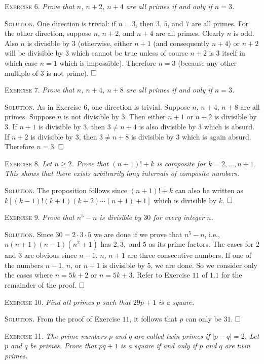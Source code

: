 \documentclass[11pt, leqno]{article}
\newcommand{\done}{\ensuremath{\hfill\square}}
\begin{document}
\textsc{Exercise 6}. \emph{Prove that $n$, $n+2$, $n+4$ are all primes if and only if $n=3$.}

\textsc{Solution}. One direction is trivial: if $n=3$, then $3$, $5$, and $7$ are all primes. For the other direction, suppose $n$, $n+2$, and $n+4$ are all primes. Clearly $n$ is odd. Also $n$ is divisible by $3$ (otherwise, either $n+1$ (and consequently $n+4$) or $n+2$ will be divisible by $3$ which cannot be true unless of course $n+2$ is $3$ itself in which case $n=1$ which is impossible). Therefore $n=3$ (because any other multiple of 3 is not prime). \done

\textsc{Exercise 7}. \emph{Prove that $n$, $n+4$, $n+8$ are all primes if and only if $n=3$.}

\textsc{Solution}. As in Exercise 6, one direction is trivial. Suppose $n$, $n+4$, $n+8$ are all primes. Suppose $n$ is not divisible by $3$. Then either $n+1$ or $n+2$ is divisible by $3$. If $n+1$ is divisible by $3$, then $3 \ne n+4$ is also divisible by $3$ which is absurd. If $n+2$ is divisible by $3$, then $3 \ne n+8$ is divisible by $3$ which is again absurd. Therefore $n=3$. \done

\textsc{Exercise 8}. \emph{Let $n \geq 2$. Prove that $(n+1)! + k$ is composite for $k= 2, \ldots, n+1$. This shows that there exists arbitrarily long intervals of composite numbers.}

\textsc{Solution}. The proposition follows since $(n+1)!+k$ can also be written as $k[(k-1)!(k+1)(k+2)\cdots (n+1) + 1]$ which is divisible by $k$. \done

\textsc{Exercise 9}. \emph{Prove that $n^5-n$ is divisible by $30$ for every integer $n$.}

\textsc{Solution}. Since $30 = 2\cdot 3\cdot 5$ we are done if we prove that $n^5-n$, i.e., $n(n+1)(n-1)(n^2+1)$ has $2, 3,$ and $5$ as its prime factors. The cases for $2$ and $3$ are obvious since $n-1$, $n$, $n+1$ are three consecutive numbers. If one of the numbers $n-1$, $n$, or $n+1$ is divisible by $5$, we are done. So we consider only the cases where $n=5k+2$ or $n=5k+3$. Refer to Exercise $11$ of $1.1$ for the remainder of the proof. \done

\textsc{Exercise 10}. \emph{Find all primes $p$ such that $29p+1$ is a square.}

\textsc{Solution}. From the proof of Exercise $11$, it follows that $p$ can only be $31$. \done

\textsc{Exercise 11}. \emph{The prime numbers $p$ and $q$ are called twin primes if $|p-q|=2$. Let $p$ and $q$ be primes. Prove that $pq+1$ is a square if and only if $p$ and $q$ are twin primes.}
\end{document}
